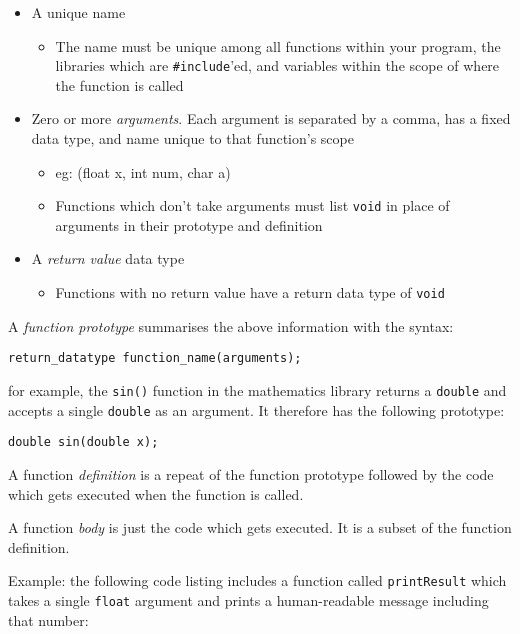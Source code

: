 \documentclass{lab}
\begin{document}
\begin{itemize}
	\item A unique name
		\begin{itemize}
			\item The name must be unique among all functions within your program, the libraries which are \texttt{\#include}'ed, and variables within the scope of where the function is called
		\end{itemize}
	\item Zero or more \textit{arguments}. Each argument is separated by a comma, has a fixed data type, and name unique to that function's scope
		\begin{itemize}
			\item eg: (float x, int num, char a)
			\item Functions which don't take arguments must list \texttt{void} in place of arguments in their prototype and definition
		\end{itemize}
	\item A \textit{return value} data type
		\begin{itemize}
			\item Functions with no return value have a return data type of \texttt{void}
		\end{itemize}
\end{itemize}

A \textit{function prototype} summarises the above information with the syntax:
\begin{lstlisting}[style=CStyle]
return_datatype function_name(arguments);
\end{lstlisting}
for example, the \texttt{sin()} function in the mathematics library returns a \texttt{double} and accepts a single \texttt{double} as an argument. It therefore has the following prototype:
\begin{lstlisting}[style=CStyle]
double sin(double x);
\end{lstlisting}


A function \textit{definition} is a repeat of the function prototype followed by the code which gets executed when the function is called.

A function \textit{body} is just the code which gets executed. It is a subset of the function definition.

Example: the following code listing includes a function called \texttt{printResult} which takes a single \texttt{float} argument and prints a human-readable message including that number:
\end{document}

